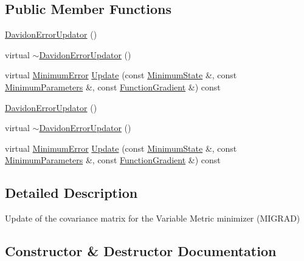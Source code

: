 \subsection*{Public Member Functions}
\begin{DoxyCompactItemize}
\item 
\mbox{\hyperlink{classROOT_1_1Minuit2_1_1DavidonErrorUpdator_ad65143bed469946d2bfb1025755275ee}{Davidon\+Error\+Updator}} ()
\item 
virtual \mbox{\hyperlink{classROOT_1_1Minuit2_1_1DavidonErrorUpdator_a3308df97623b7a93a33d1146e8182fc5}{$\sim$\+Davidon\+Error\+Updator}} ()
\item 
virtual \mbox{\hyperlink{classROOT_1_1Minuit2_1_1MinimumError}{Minimum\+Error}} \mbox{\hyperlink{classROOT_1_1Minuit2_1_1DavidonErrorUpdator_afad671aa523cbd9f17af376c51c3ce97}{Update}} (const \mbox{\hyperlink{classROOT_1_1Minuit2_1_1MinimumState}{Minimum\+State}} \&, const \mbox{\hyperlink{classROOT_1_1Minuit2_1_1MinimumParameters}{Minimum\+Parameters}} \&, const \mbox{\hyperlink{classROOT_1_1Minuit2_1_1FunctionGradient}{Function\+Gradient}} \&) const
\item 
\mbox{\hyperlink{classROOT_1_1Minuit2_1_1DavidonErrorUpdator_ad65143bed469946d2bfb1025755275ee}{Davidon\+Error\+Updator}} ()
\item 
virtual \mbox{\hyperlink{classROOT_1_1Minuit2_1_1DavidonErrorUpdator_a3308df97623b7a93a33d1146e8182fc5}{$\sim$\+Davidon\+Error\+Updator}} ()
\item 
virtual \mbox{\hyperlink{classROOT_1_1Minuit2_1_1MinimumError}{Minimum\+Error}} \mbox{\hyperlink{classROOT_1_1Minuit2_1_1DavidonErrorUpdator_aae088602f78dc3bee91f7ce2534311e9}{Update}} (const \mbox{\hyperlink{classROOT_1_1Minuit2_1_1MinimumState}{Minimum\+State}} \&, const \mbox{\hyperlink{classROOT_1_1Minuit2_1_1MinimumParameters}{Minimum\+Parameters}} \&, const \mbox{\hyperlink{classROOT_1_1Minuit2_1_1FunctionGradient}{Function\+Gradient}} \&) const
\end{DoxyCompactItemize}


\subsection{Detailed Description}
Update of the covariance matrix for the Variable Metric minimizer (M\+I\+G\+R\+AD) 

\subsection{Constructor \& Destructor Documentation}
\mbox{\label{classROOT_1_1Minuit2_1_1DavidonErrorUpdator_ad65143bed469946d2bfb1025755275ee}} 
